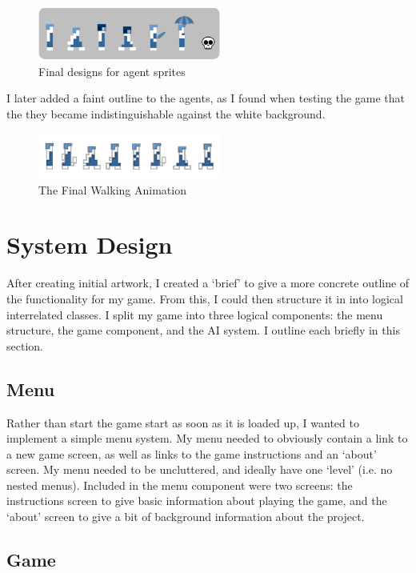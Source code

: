 \documentclass[a4paper,oneside]{report}
\begin{document}
\begin{figure}[h!]
  \centering
    \includegraphics[width=60mm]{sources/images/Final}
    \caption{Final designs for agent sprites}
\end{figure}

I later added a faint outline to the agents, as I found when testing the game that the they became indistinguishable against the white background.
	
\begin{figure}[h!]
  \centering
    \includegraphics[width=60mm]{sources/images/Lemming_walk_anim}
    \caption{The Final Walking Animation}
\end{figure}
	
\chapter{System Design}

After creating initial artwork, I created a `brief' to give a more concrete outline of the functionality for my game. From this, I could then structure it in into logical interrelated classes. I split my game into three logical components: the menu structure, the game component, and the AI system. I outline each briefly in this section.

\section{Menu}

Rather than start the game start as soon as it is loaded up, I wanted to implement a simple menu system. My menu needed to obviously contain a link to a new game screen, as well as links to the game instructions and an `about' screen. My menu needed to be uncluttered, and ideally have one `level' (i.e. no nested menus). Included in the menu component were two screens: the instructions screen to give basic information about playing the game, and the `about' screen to give a bit of background information about the project.

\section{Game}
\end{document}
